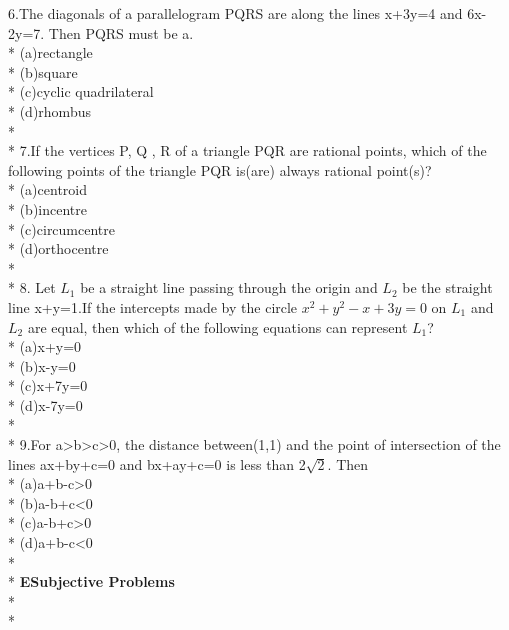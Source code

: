 \documentclass{article}
\begin{document}
{6.\enspace The diagonals of a parallelogram PQRS are along the lines x+3y=4 and 6x-2y=7. Then PQRS must be a.\\*
(a)\enspace rectangle\\*
(b)\enspace square\\*
(c)\enspace cyclic quadrilateral\\*
(d)\enspace rhombus\\*\\*
7.\enspace If the vertices P, Q , R of a triangle PQR are rational points, which of the following points of the triangle PQR is(are) always rational point(s)?\\*
(a)\enspace centroid\\*
(b)\enspace incentre\\*
(c)\enspace circumcentre\\*
(d)\enspace orthocentre\\*\\*
8. Let $L_1$ be a straight line passing through the origin and $L_2$ be the straight line x+y=1.If the intercepts made by the circle $x^2+y^2 -x+3y= 0$ on $L_1$ and $L_2$ are equal, then which of the following equations can represent $L_1$?\\*
(a)\enspace x+y=0\\*
(b)\enspace x-y=0\\*
(c)\enspace x+7y=0\\*
(d)\enspace x-7y=0\\*\\*
9.\enspace For a\textgreater b\textgreater c\textgreater 0, the distance between(1,1) and the point of intersection of the lines ax+by+c=0 and bx+ay+c=0 is less than 2$\sqrt2$. Then \\*
(a)\enspace a+b-c\textgreater 0\\*
(b)\enspace a-b+c\textless 0\\*
(c)\enspace a-b+c\textgreater 0\\*
(d)\enspace a+b-c\textless 0\\*\\*
}
{\Large \textbf{E\enspace Subjective Problems}}\\*\\*
\end{document}
